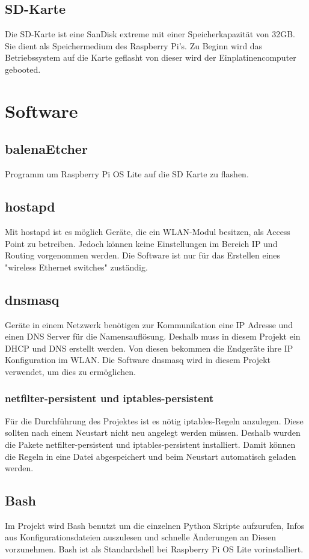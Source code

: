 \documentclass[a4paper,11pt,singlespacing]{article}
\begin{document}
			\subsection{SD-Karte}
    			Die SD-Karte ist eine SanDisk extreme mit einer Speicherkapazität von 32GB. Sie dient als Speichermedium des Raspberry Pi's. Zu Beginn wird das Betriebssystem auf die Karte geflasht von dieser wird der Einplatinencomputer gebooted.

    			
    	\section{Software}
    		\subsection{balenaEtcher}
    			Programm um Raspberry Pi OS Lite auf die SD Karte zu flashen.
    		\subsection{hostapd}
        		Mit hostapd ist es möglich Geräte, die ein WLAN-Modul besitzen, als Access Point zu betreiben. Jedoch können keine Einstellungen im Bereich IP und Routing vorgenommen werden. Die Software ist nur für das Erstellen eines "wireless Ethernet switches" zuständig. \cite{Quote_hostapd1} 
    		\subsection{dnsmasq}
        		Geräte in einem Netzwerk benötigen zur Kommunikation eine IP Adresse und einen DNS Server für die Namensauflösung. Deshalb muss in diesem Projekt ein DHCP und DNS erstellt werden. Von diesen bekommen die Endgeräte ihre IP Konfiguration im WLAN. Die Software dnsmasq wird in diesem Projekt verwendet, um dies zu ermöglichen.
    		\subsubsection{netfilter-persistent und iptables-persistent}
        		Für die Durchführung des Projektes ist es nötig iptables-Regeln anzulegen. Diese sollten nach einem Neustart nicht neu angelegt werden müssen. Deshalb wurden die Pakete netfilter-persistent und iptables-persistent installiert. Damit können die Regeln in eine Datei abgespeichert und beim Neustart automatisch geladen werden.
        	\subsection{Bash}
        		Im Projekt wird Bash benutzt um die einzelnen Python Skripte aufzurufen, Infos aus Konfigurationsdateien auszulesen und schnelle Änderungen an Diesen vorzunehmen. Bash ist als Standardshell bei Raspberry Pi OS Lite vorinstalliert. 
\end{document}

